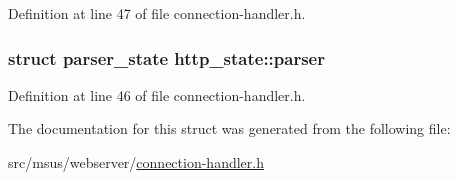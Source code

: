Definition at line 47 of file connection-\/handler.\-h.

\hypertarget{structhttp__state_a3eda42ab7c2b2dfbc61a1cc5eb076555}{
\subsubsection[{parser}]{\setlength{\rightskip}{0pt plus 5cm}struct {\bf parser\-\_\-state} http\-\_\-state\-::parser}}\label{structhttp__state_a3eda42ab7c2b2dfbc61a1cc5eb076555}


Definition at line 46 of file connection-\/handler.\-h.



The documentation for this struct was generated from the following file\-:\begin{DoxyCompactItemize}
\item 
src/msus/webserver/\hyperlink{connection-handler_8h}{connection-\/handler.\-h}\end{DoxyCompactItemize}
